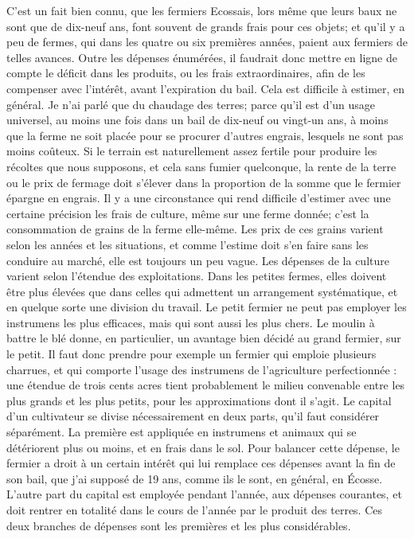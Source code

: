 C'est un fait bien connu, que les fermiers Ecossais, lors même que leurs baux ne sont que de dix-neuf ans, font souvent de grands frais pour ces objets; et qu'il y a peu de fermes, qui dans les quatre ou six premières années, paient aux fermiers de telles avances.\setcounter{page}{306} Outre les dépenses énumérées, il faudrait donc mettre en ligne de compte le déficit dans les produits, ou les frais extraordinaires, afin de les compenser avec l'intérêt, avant l'expiration du bail. Cela est difficile à estimer, en général. Je n'ai parlé que du chaudage des terres; parce qu'il est d'un usage universel, au moins une fois dans un bail de dix-neuf ou vingt-un ans, à moins que la ferme ne soit placée pour se procurer d'autres engrais, lesquels ne sont pas moins coûteux. Si le terrain est naturellement assez fertile pour produire les récoltes que nous supposons, et cela sans fumier quelconque, la rente de la terre ou le prix de fermage doit s'élever dans la proportion de la somme que le fermier épargne en engrais.
Il y a une circonstance qui rend difficile d'estimer avec une certaine précision les frais de culture, même sur une ferme donnée; c'est la consommation de grains de la ferme elle-même. Les prix de ces grains varient selon les années et les situations, et comme l'estime doit s'en faire sans les conduire au marché, elle est toujours un peu vague.
Les dépenses de la culture varient selon l'étendue des exploitations. Dans les petites fermes, elles doivent être plus élevées que\setcounter{page}{307} dans celles qui admettent un arrangement systématique, et en quelque sorte une division du travail. Le petit fermier ne peut pas employer les instrumens les plus efficaces, mais qui sont aussi les plus chers. Le moulin à battre le blé donne, en particulier, un avantage bien décidé au grand fermier, sur le petit. Il faut donc prendre pour exemple un fermier qui emploie plusieurs charrues, et qui comporte l'usage des instrumens de l'agriculture perfectionnée : une étendue de trois cents acres tient probablement le milieu convenable entre les plus grands et les plus petits, pour les approximations dont il s'agit. Le capital d'un cultivateur se divise nécessairement en deux parts, qu'il faut considérer séparément. La première est appliquée en instrumens et animaux qui se détériorent plus ou moins, et en frais dans le sol. Pour balancer cette dépense, le fermier a droit à un certain intérêt qui lui remplace ces dépenses avant la fin de son bail, que j'ai supposé de 19 ans, comme ils le sont, en général, en Écosse. L'autre part du capital est employée pendant l'année, aux dépenses courantes, et doit rentrer en totalité dans le cours de l'année par le produit des\setcounter{page}{308} terres. Ces deux branches de dépenses sont les premières et les plus considérables.
